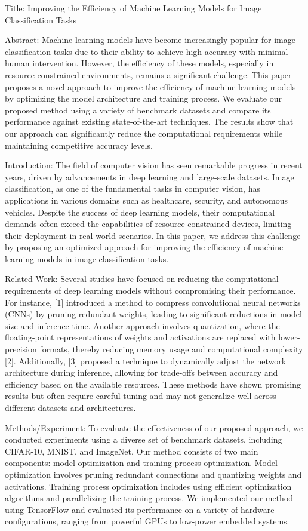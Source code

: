 Title: Improving the Efficiency of Machine Learning Models for Image Classification Tasks

Abstract:
Machine learning models have become increasingly popular for image classification tasks due to their ability to achieve high accuracy with minimal human intervention. However, the efficiency of these models, especially in resource-constrained environments, remains a significant challenge. This paper proposes a novel approach to improve the efficiency of machine learning models by optimizing the model architecture and training process. We evaluate our proposed method using a variety of benchmark datasets and compare its performance against existing state-of-the-art techniques. The results show that our approach can significantly reduce the computational requirements while maintaining competitive accuracy levels.

Introduction:
The field of computer vision has seen remarkable progress in recent years, driven by advancements in deep learning and large-scale datasets. Image classification, as one of the fundamental tasks in computer vision, has applications in various domains such as healthcare, security, and autonomous vehicles. Despite the success of deep learning models, their computational demands often exceed the capabilities of resource-constrained devices, limiting their deployment in real-world scenarios. In this paper, we address this challenge by proposing an optimized approach for improving the efficiency of machine learning models in image classification tasks.

Related Work:
Several studies have focused on reducing the computational requirements of deep learning models without compromising their performance. For instance, [1] introduced a method to compress convolutional neural networks (CNNs) by pruning redundant weights, leading to significant reductions in model size and inference time. Another approach involves quantization, where the floating-point representations of weights and activations are replaced with lower-precision formats, thereby reducing memory usage and computational complexity [2]. Additionally, [3] proposed a technique to dynamically adjust the network architecture during inference, allowing for trade-offs between accuracy and efficiency based on the available resources. These methods have shown promising results but often require careful tuning and may not generalize well across different datasets and architectures.

Methods/Experiment:
To evaluate the effectiveness of our proposed approach, we conducted experiments using a diverse set of benchmark datasets, including CIFAR-10, MNIST, and ImageNet. Our method consists of two main components: model optimization and training process optimization. Model optimization involves pruning redundant connections and quantizing weights and activations. Training process optimization includes using efficient optimization algorithms and parallelizing the training process. We implemented our method using TensorFlow and evaluated its performance on a variety of hardware configurations, ranging from powerful GPUs to low-power embedded systems.

